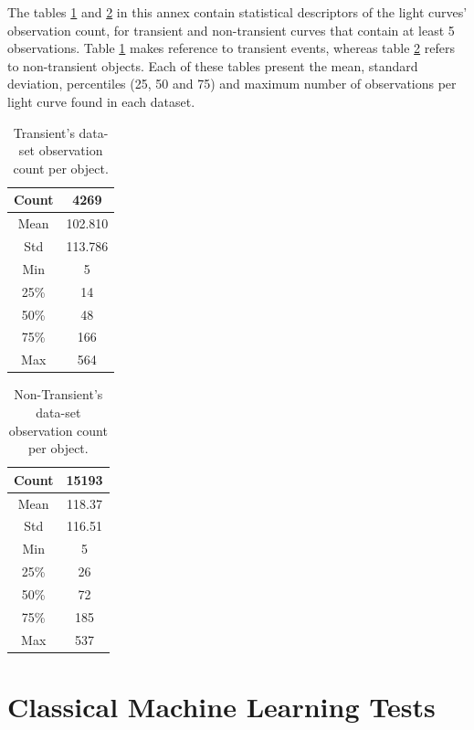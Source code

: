 \documentclass[a4paper,fleqn,usenatbib]{mnras}
\begin{document}
The tables \ref{Transient-Observation-Count} and
\ref{Non-Transient-Observation-Count} in this annex contain
statistical descriptors of the light curves' observation count, for
transient and non-transient curves that contain at least 5
observations. 
Table \ref{Transient-Observation-Count} makes reference to transient
events, whereas table \ref{Non-Transient-Observation-Count} refers to
non-transient objects.  
Each of these tables present the mean, standard deviation, percentiles
(25, 50 and 75) and maximum number of observations per light curve
found in each dataset. 

\begin{table}
\centering
\begin{tabular}{c|c}
    \hline
    Count & 4269 \\
    \hline
    Mean & 102.810 \\
    Std & 113.786 \\
    Min & 5 \\
    25\% & 14 \\
    50\% & 48 \\
    75\% & 166 \\
    Max & 564 \\
    \hline
\end{tabular}
\caption{Transient's data-set observation count per object.}
\label{Transient-Observation-Count}
\end{table}

\begin{table}
\centering
\begin{tabular}{c|c}
    \hline
    Count & 15193 \\
    \hline
    Mean & 118.37 \\
    Std & 116.51 \\
    Min & 5 \\
    25\% & 26 \\
    50\% & 72 \\
    75\% & 185 \\
    Max & 537 \\
    \hline
\end{tabular}
\caption{Non-Transient's data-set observation count per object.}
\label{Non-Transient-Observation-Count}
\end{table}



\section{Classical Machine Learning Tests} \label{section_method}
\end{document}
